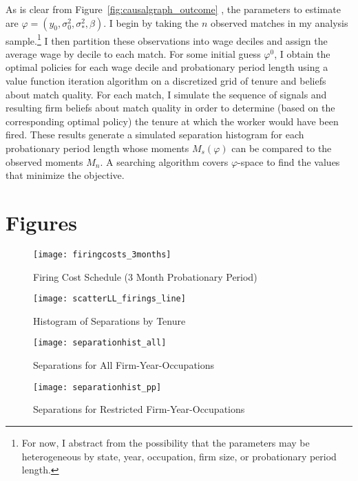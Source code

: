 \documentclass[12pt]{article}
\begin{document}
As is clear from Figure~\ref{fig:causalgraph_outcome} , the parameters to estimate are $\varphi=(y_0,\sigma_0^2,\sigma_*^2,\beta)$.
I begin by taking the $n$ observed matches in my analysis sample.\footnote{
For now, I abstract from the possibility that the parameters may be heterogeneous by state, year, occupation, firm size, or probationary period length.}
I then partition these observations into wage deciles and assign the average wage by decile to each match.
For some initial guess $\varphi^0$, I obtain the optimal policies for each wage decile and probationary period length using a value function iteration algorithm on a discretized grid of tenure and beliefs about match quality.
For each match, I simulate the sequence of signals and resulting firm beliefs about match quality in order to determine (based on the corresponding optimal policy) the tenure at which the worker would have been fired.
These results generate a simulated separation histogram for each probationary period length whose moments $M_s(\varphi)$ can be compared to the observed moments $M_n$.
A searching algorithm covers $\varphi$-space to find the values that minimize the objective.

\newpage 

\section{Figures}

\begin{figure}[h!]
  \centering
  \texttt{[image: firingcosts\_3months]}
  \caption{Firing Cost Schedule (3 Month Probationary Period)}
  \label{fig:firingcosts_3months}
\end{figure}

\newpage

\begin{figure}[h!]
  \centering
  \texttt{[image: scatterLL\_firings\_line]}
  \caption{Histogram of Separations by Tenure}
  \label{fig:scatterLL_firings_line}
\end{figure}

\newpage 

\begin{figure}[h!]
  \centering
  \texttt{[image: separationhist\_all]}
  \caption{Separations for All Firm-Year-Occupations}
  \label{fig:separationhist_all}
\end{figure}

\begin{figure}[h!]
  \centering
  \texttt{[image: separationhist\_pp]}
  \caption{Separations for Restricted Firm-Year-Occupations}
  \label{fig:separationhist_pp}
\end{figure}
\end{document}
